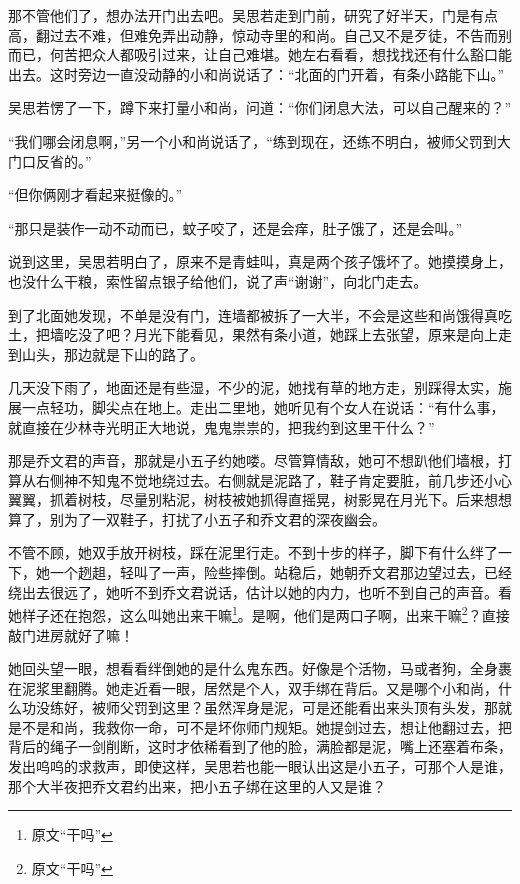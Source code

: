 那不管他们了，想办法开门出去吧。吴思若走到门前，研究了好半天，门是有点高，翻过去不难，但难免弄出动静，惊动寺里的和尚。自己又不是歹徒，不告而别而已，何苦把众人都吸引过来，让自己难堪。她左右看看，想找找还有什么豁口能出去。这时旁边一直没动静的小和尚说话了：“北面的门开着，有条小路能下山。”

吴思若愣了一下，蹲下来打量小和尚，问道：“你们闭息大法，可以自己醒来的？”

“我们哪会闭息啊，”另一个小和尚说话了，“练到现在，还练不明白，被师父罚到大门口反省的。”

“但你俩刚才看起来挺像的。”

“那只是装作一动不动而已，蚊子咬了，还是会痒，肚子饿了，还是会叫。”

说到这里，吴思若明白了，原来不是青蛙叫，真是两个孩子饿坏了。她摸摸身上，也没什么干粮，索性留点银子给他们，说了声“谢谢”，向北门走去。

到了北面她发现，不单是没有门，连墙都被拆了一大半，不会是这些和尚饿得真吃土，把墙吃没了吧？月光下能看见，果然有条小道，她踩上去张望，原来是向上走到山头，那边就是下山的路了。

几天没下雨了，地面还是有些湿，不少的泥，她找有草的地方走，别踩得太实，施展一点轻功，脚尖点在地上。走出二里地，她听见有个女人在说话：“有什么事，就直接在少林寺光明正大地说，鬼鬼祟祟的，把我约到这里干什么？”

那是乔文君的声音，那就是小五子约她喽。尽管算情敌，她可不想趴他们墙根，打算从右侧神不知鬼不觉地绕过去。右侧就是泥路了，鞋子肯定要脏，前几步还小心翼翼，抓着树枝，尽量别粘泥，树枝被她抓得直摇晃，树影晃在月光下。后来想想算了，别为了一双鞋子，打扰了小五子和乔文君的深夜幽会。

不管不顾，她双手放开树枝，踩在泥里行走。不到十步的样子，脚下有什么绊了一下，她一个趔趄，轻叫了一声，险些摔倒。站稳后，她朝乔文君那边望过去，已经绕出去很远了，她听不到乔文君说话，估计以她的内力，也听不到自己的声音。看她样子还在抱怨，这么叫她出来干嘛\footnote{原文“干吗”}。是啊，他们是两口子啊，出来干嘛\footnote{原文“干吗”}？直接敲门进房就好了嘛！

她回头望一眼，想看看绊倒她的是什么鬼东西。好像是个活物，马或者狗，全身裹在泥浆里翻腾。她走近看一眼，居然是个人，双手绑在背后。又是哪个小和尚，什么功没练好，被师父罚到这里？虽然浑身是泥，可是还能看出来头顶有头发，那就是不是和尚，我救你一命，可不是坏你师门规矩。她提剑过去，想让他翻过去，把背后的绳子一剑削断，这时才依稀看到了他的脸，满脸都是泥，嘴上还塞着布条，发出呜呜的求救声，即使这样，吴思若也能一眼认出这是小五子，可那个人是谁，那个大半夜把乔文君约出来，把小五子绑在这里的人又是谁？

\newpage